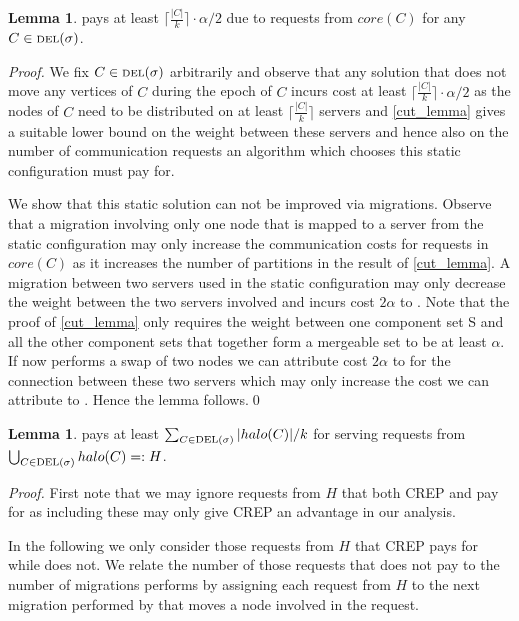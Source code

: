 \documentclass[xcolor=dvipsnames, tikz, 12pt]{article}
\newcommand{\nl}{\newline}
\newcommand{\crep}{C{\scriptsize REP}}
\newcommand{\del}{\text{\scriptsize DEL}}
\newcommand{\opt}{\text{O{\scriptsize PT}}}
\theoremstyle{definition}
\newtheorem{lemma}[defi]{Lemma}
\begin{document}
\begin{lemma}
	\opt{} pays at least $\lceil\frac{|C|}{k}\rceil\cdot\alpha/2$ due to requests from $core(C)$ for any $C\in\del{}(\sigma)$.
\end{lemma}

\textit{Proof.} We fix $C\in\del{}(\sigma)$ arbitrarily and observe that any solution that does not move any vertices of $C$ during the epoch of $C$ incurs cost at least $\lceil\frac{|C|}{k}\rceil\cdot\alpha/2$ as the nodes of $C$ need to be distributed on at least $\lceil\frac{|C|}{k}\rceil$ servers and \cref{cut_lemma} gives a suitable lower bound on the weight between these servers and hence also on the number of communication requests an algorithm which chooses this static configuration must pay for.

We show that this static solution can not be improved via migrations. Observe that a migration involving only one node that is mapped to a server from the static configuration may only increase the communication costs for requests in $core(C)$ as it increases the number of partitions in the result of \cref{cut_lemma}. A migration between two servers used in the static configuration may only decrease the weight between the two servers involved and incurs cost $2\alpha$ to \opt{}. Note that the proof of  \cref{cut_lemma} only requires the weight between one component set S and all the other component sets that together form a mergeable set to be at least $\alpha$. If \opt{} now performs a swap of two nodes we can attribute cost $2\alpha$ to \opt{} for the connection between these two servers which may only increase the cost we can attribute to \opt{}. Hence the lemma follows.\qed\nl

\begin{lemma}
	\opt{} pays at least $\sum_{C\in\del{}(\sigma)}|halo(C)|/k$ for serving requests from\nl $\bigcup_{C\in\del{}(\sigma)}halo(C)=:H$.
\end{lemma}

\textit{Proof.} First note that we may ignore requests from $H$ that both \crep{} and \opt{} pay for as including these may only give \crep{} an advantage in our analysis.

In the following we only consider those requests from $H$ that \crep{} pays for while \opt{} does not. We relate the number of those requests that \opt{} does not pay to the number of migrations \opt{} performs by assigning each request from $H$ to the next migration performed by \opt{} that moves a node involved in the request.
\end{document}

